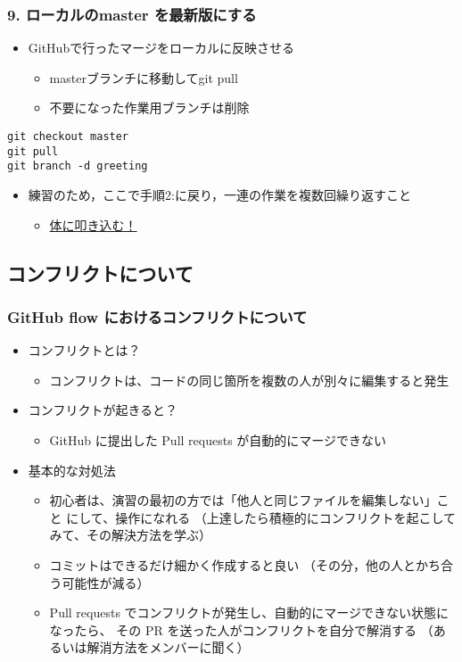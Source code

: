 \documentclass[a4paper,twoside,twocolumn]{bxjsarticle}
\begin{document}
\subsubsection{9. ローカルのmaster を最新版にする}
\label{sec-2-3-10}

\begin{itemize}
\item GitHubで行ったマージをローカルに反映させる
\begin{itemize}
\item masterブランチに移動してgit pull
\item 不要になった作業用ブランチは削除
\end{itemize}
\end{itemize}

\begin{verbatim}
git checkout master
git pull
git branch -d greeting
\end{verbatim}

\begin{itemize}
\item 練習のため，ここで手順2:に戻り，一連の作業を複数回繰り返すこと
\begin{itemize}
\item \uline{体に叩き込む！}
\end{itemize}
\end{itemize}

\subsection{コンフリクトについて}
\label{sec-2-4}
\subsubsection{GitHub flow におけるコンフリクトについて}
\label{sec-2-4-1}
\begin{itemize}
\item コンフリクトとは？
\begin{itemize}
\item コンフリクトは、コードの同じ箇所を複数の人が別々に編集すると発生
\end{itemize}
\item コンフリクトが起きると？
\begin{itemize}
\item GitHub に提出した Pull requests が自動的にマージできない
\end{itemize}
\item 基本的な対処法
\begin{itemize}
\item 初心者は、演習の最初の方では「他人と同じファイルを編集しない」こと
にして、操作になれる
（上達したら積極的にコンフリクトを起こしてみて、その解決方法を学ぶ）
\item コミットはできるだけ細かく作成すると良い
（その分，他の人とかち合う可能性が減る）
\item Pull requests でコンフリクトが発生し、自動的にマージできない状態に
なったら、 その PR を送った人がコンフリクトを自分で解消する
（あるいは解消方法をメンバーに聞く）
\end{itemize}
\end{itemize}
\end{document}
